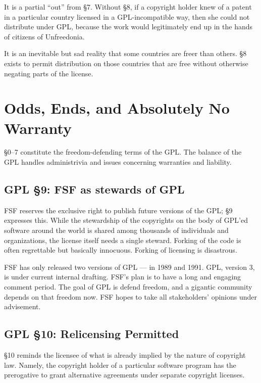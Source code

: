 \documentclass[12pt]{report}
\begin{document}
It is a partial ``out'' from \S 7.  Without \S 8, if a copyright holder
knew of a patent in a particular country licensed in a GPL-incompatible
way, then she could not distribute under GPL, because the work would
legitimately end up in the hands of citizens of Unfreedonia.

It is an inevitable but sad reality that some countries are freer than
others.  \S 8 exists to permit distribution on those countries that are
free without otherwise negating parts of the license.

\chapter{Odds, Ends, and Absolutely No Warranty}

\S 0--7 constitute the freedom-defending terms of the GPL.  The balance
of the GPL handles administrivia and issues concerning warranties and
liability.

\section{GPL \S 9: FSF as stewards of GPL}
\label{GPLs9}

FSF reserves the exclusive right to publish future versions of the GPL\@;
\S 9 expresses this.  While the stewardship of the copyrights on the body
of GPL'ed software around the world is shared among thousands of
individuals and organizations, the license itself needs a single steward.
Forking of the code is often regrettable but basically innocuous.  Forking
of licensing is disastrous.

FSF has only released two versions of GPL --- in 1989 and 1991.  GPL,
version 3, is under current internal drafting.  FSF's plan is to have a
long and engaging comment period.  The goal of GPL is defend freedom, and
a gigantic community depends on that freedom now.  FSF hopes to take all
stakeholders' opinions under advisement.

\section{GPL \S 10: Relicensing Permitted}
\label{GPLs10}

\S 10 reminds the licensee of what is already implied by the nature of
copyright law.  Namely, the copyright holder of a particular software
program has the prerogative to grant alternative agreements under separate
copyright licenses.
\end{document}
